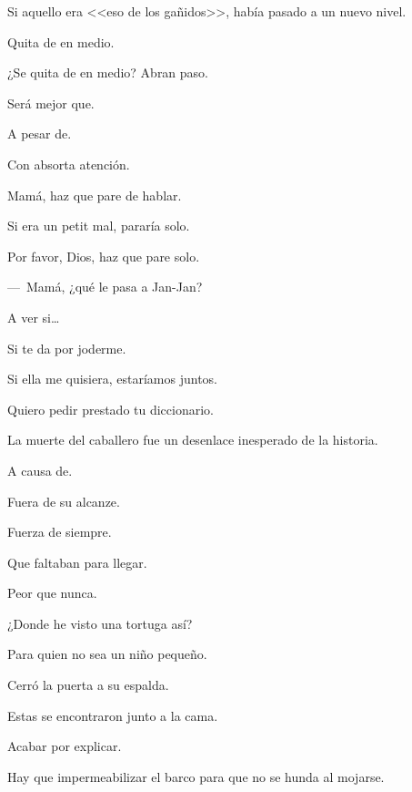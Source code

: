 \sk
Si aquello era <<eso de los gañidos>>, había pasado a un nuevo nivel. 

\sk
Quita de en medio. 

\sk
¿Se quita de en medio? Abran paso. 

\sk
Será mejor que. 

\sk
A pesar de. 

\sk
Con absorta atención. 

\sk
Mamá, haz que pare de hablar. 

\sk
Si era un petit mal, pararía solo. 

\sk
Por favor, Dios, haz que pare solo. 

\sk
---~Mamá, ¿qué le pasa a Jan-Jan? 

\sk
A ver si\ldots{} 

\sk
Si te da por joderme. \nb{}

\sk
Si ella me quisiera, estaríamos juntos. \nb{}

\sk
Quiero pedir prestado tu diccionario. \nb{}

\sk
La muerte del caballero fue un desenlace inesperado de la historia. \nb{}

\sk
A causa de. 

\sk
Fuera de su alcanze. 

\sk
Fuerza de siempre. 

\sk
Que faltaban para llegar. 

\sk
Peor que nunca. 

\sk
¿Donde he visto una tortuga así? 

\sk
Para quien no sea un niño pequeño. 

\sk
Cerró la puerta a su espalda. 

\sk
Estas se encontraron junto a la cama. 

\sk
Acabar por explicar. 

\sk
Hay que impermeabilizar el barco para que no se hunda al mojarse. 

